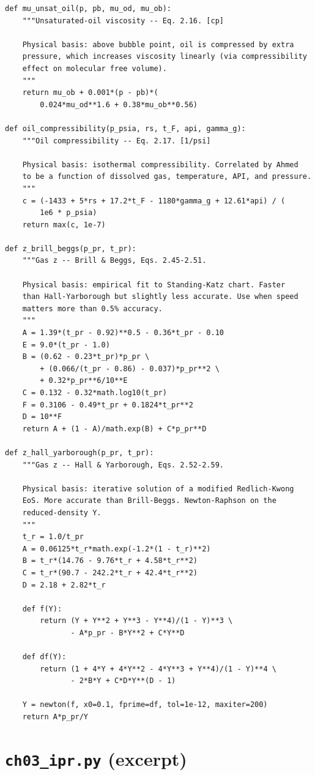 \documentclass[11pt,a4paper,openany]{book}
\newcommand{\code}[1]{\texttt{#1}}
\begin{document}
\begin{lstlisting}
def mu_unsat_oil(p, pb, mu_od, mu_ob):
    """Unsaturated-oil viscosity -- Eq. 2.16. [cp]

    Physical basis: above bubble point, oil is compressed by extra
    pressure, which increases viscosity linearly (via compressibility
    effect on molecular free volume).
    """
    return mu_ob + 0.001*(p - pb)*(
        0.024*mu_od**1.6 + 0.38*mu_ob**0.56)

def oil_compressibility(p_psia, rs, t_F, api, gamma_g):
    """Oil compressibility -- Eq. 2.17. [1/psi]

    Physical basis: isothermal compressibility. Correlated by Ahmed
    to be a function of dissolved gas, temperature, API, and pressure.
    """
    c = (-1433 + 5*rs + 17.2*t_F - 1180*gamma_g + 12.61*api) / (
        1e6 * p_psia)
    return max(c, 1e-7)

def z_brill_beggs(p_pr, t_pr):
    """Gas z -- Brill & Beggs, Eqs. 2.45-2.51.

    Physical basis: empirical fit to Standing-Katz chart. Faster
    than Hall-Yarborough but slightly less accurate. Use when speed
    matters more than 0.5% accuracy.
    """
    A = 1.39*(t_pr - 0.92)**0.5 - 0.36*t_pr - 0.10
    E = 9.0*(t_pr - 1.0)
    B = (0.62 - 0.23*t_pr)*p_pr \
        + (0.066/(t_pr - 0.86) - 0.037)*p_pr**2 \
        + 0.32*p_pr**6/10**E
    C = 0.132 - 0.32*math.log10(t_pr)
    F = 0.3106 - 0.49*t_pr + 0.1824*t_pr**2
    D = 10**F
    return A + (1 - A)/math.exp(B) + C*p_pr**D

def z_hall_yarborough(p_pr, t_pr):
    """Gas z -- Hall & Yarborough, Eqs. 2.52-2.59.

    Physical basis: iterative solution of a modified Redlich-Kwong
    EoS. More accurate than Brill-Beggs. Newton-Raphson on the
    reduced-density Y.
    """
    t_r = 1.0/t_pr
    A = 0.06125*t_r*math.exp(-1.2*(1 - t_r)**2)
    B = t_r*(14.76 - 9.76*t_r + 4.58*t_r**2)
    C = t_r*(90.7 - 242.2*t_r + 42.4*t_r**2)
    D = 2.18 + 2.82*t_r

    def f(Y):
        return (Y + Y**2 + Y**3 - Y**4)/(1 - Y)**3 \
               - A*p_pr - B*Y**2 + C*Y**D

    def df(Y):
        return (1 + 4*Y + 4*Y**2 - 4*Y**3 + Y**4)/(1 - Y)**4 \
               - 2*B*Y + C*D*Y**(D - 1)

    Y = newton(f, x0=0.1, fprime=df, tol=1e-12, maxiter=200)
    return A*p_pr/Y
\end{lstlisting}

\section{\code{ch03\_ipr.py} (excerpt)}
\end{document}

